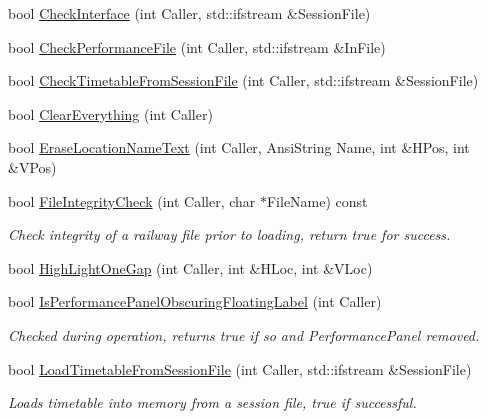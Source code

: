 \begin{DoxyCompactItemize}
bool \mbox{\hyperlink{class_t_interface_ae484cb4ac3ce536b922fff402e6689f7}{Check\+Interface}} (int Caller, std\+::ifstream \&Session\+File)
\item 
bool \mbox{\hyperlink{class_t_interface_ace78190347eb85b1048e5309075d04b0}{Check\+Performance\+File}} (int Caller, std\+::ifstream \&In\+File)
\item 
bool \mbox{\hyperlink{class_t_interface_a1c76c13d451cb6955d77d37e68614811}{Check\+Timetable\+From\+Session\+File}} (int Caller, std\+::ifstream \&Session\+File)
\item 
bool \mbox{\hyperlink{class_t_interface_a686430e962991bc32742399164187b62}{Clear\+Everything}} (int Caller)
\item 
bool \mbox{\hyperlink{class_t_interface_a2bb21fd8e1e90095cf68d63a57e938ec}{Erase\+Location\+Name\+Text}} (int Caller, Ansi\+String Name, int \&H\+Pos, int \&V\+Pos)
\item 
\mbox{\label{class_t_interface_a1072fd152bca3234e6730efa17f84670}} 
bool \mbox{\hyperlink{class_t_interface_a1072fd152bca3234e6730efa17f84670}{File\+Integrity\+Check}} (int Caller, char $\ast$File\+Name) const
\begin{DoxyCompactList}\small\item\em Check integrity of a railway file prior to loading, return true for success. \end{DoxyCompactList}\item 
bool \mbox{\hyperlink{class_t_interface_a44bce128da0e5ae552031e39552d0c39}{High\+Light\+One\+Gap}} (int Caller, int \&H\+Loc, int \&V\+Loc)
\item 
\mbox{\label{class_t_interface_a6aabbfe2ebc6e92d6306697e2940b86c}} 
bool \mbox{\hyperlink{class_t_interface_a6aabbfe2ebc6e92d6306697e2940b86c}{Is\+Performance\+Panel\+Obscuring\+Floating\+Label}} (int Caller)
\begin{DoxyCompactList}\small\item\em Checked during operation, returns true if so and Performance\+Panel removed. \end{DoxyCompactList}\item 
\mbox{\label{class_t_interface_a92d5a9e07b9362dee2296b7759a1c83d}} 
bool \mbox{\hyperlink{class_t_interface_a92d5a9e07b9362dee2296b7759a1c83d}{Load\+Timetable\+From\+Session\+File}} (int Caller, std\+::ifstream \&Session\+File)
\begin{DoxyCompactList}\small\item\em Loads timetable into memory from a session file, true if successful. \end{DoxyCompactList}\item 

\end{DoxyCompactItemize}
